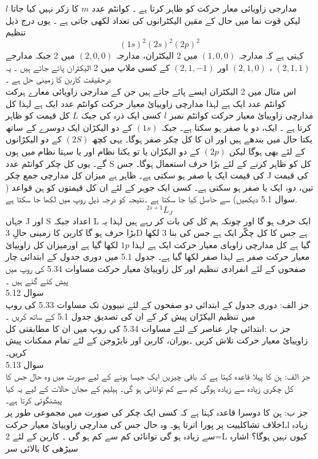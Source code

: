     \(l\)
      مدارجی زاویائی معار حرکت کو ظاہر کرتا ہے ۔ کوانٹم عدد
   \(m\) 
      کا زکر نہیں کیا جاتا لیکن قوت نما میں حال کے مقین الیکٹرانوں کی تعداد لکھی جاتی ہے ۔ یوں درج ذیل تنظیم 
\[(1s)^{2}(2s)^{2}(2p)^{2} \]
کہتی ہے کہ مدارجہ
\((1,0,0)\)
 میں 2 الیکٹران، 
مدارجہ
\(( 2,0,0)\) 
میں 2 جبکہ مدارجے
\(( 2,1,1)\)
، 
\((2,1,0)\) 
اور
 \((2,1,-1)\) 
کے کسی ملاپ میں 2 الیکٹران پائے جاتے ہیں ۔ یہ درحقیقت کاربن کا زمینی حل ہے ۔ \\
اس مثال میں 2 الیکٹران ایسے پائے جاتے ہیں جن کے مدارجی زاویائی معارے ہرکت کوانٹم  عدد ایک ہے لہذا مدارچی زاوییائ معیار حرکت کوانٹم عدد ایک ہے لہذا کل مدارچی زاوییائ معیار حرکت کوانٹم نمبر 
\(l\)
کسی ایک ذرہ کی جبک
\(L\)
کل قیمت کو ظاہر کرتا ہے ۔ ایک، دو یا صفر ہو  سکتا ہے۔ جبکہ
 \((1s)\) 
کے دو الیکڑان ایک دوسرے کے ساتھ یکتا حال میں بندھے ہیں اور ان کا کل چکر صفر ہوگا۔ یہی کچھ
\(( 2S)\)
 کے دو الیکڑانوں کے لئے بھی ہوگا لیکن
 \((2p)\)
 کے دو الیکڑان یا تو یکتا نظام اور یا سہتا نظام میں ہوں گے۔ یوں کل چکر کوانٹم عدد S کل کو ظاہر کرنے کے لئے بڑا حرف استعمال ہوگا۔ جس کی قیمت ایک یا صفر ہو سکتی ہے۔ ظاہر ہے میزان کل مدارچی جمع چکر J کی قیمت تین، دو، ایک یا صفر ہو سکتی ہے۔ کسی ایک جوہر کے لئے ان کل قیمتوں کو ہن قواعد ( سوال 5.1 دیکھیں)  سے حاصل کیا جا سکتا ہے ۔نتیجہ کو درجہ ذیل روپ میں لکھا جا سکتا ہے. 
 \[^{2s+1}L_{J}\]
  جہاں J اور S اعداد جبکہ L ایک حرف ہو گا اور چونکہ ہم کل کی بات کر رہے ہیں لہذا یہ بڑا حرف ہو گا کاربن کا زمینی حالِ 3D ہے جس کا کل چکّر ایک ہے جس کی بنا 3 لکھا گیا ہے کل مدارچی زاویای معیار حرکت ایک ہے لہذا
  \(1p\) 
  لکھا گیا ہے اورمیزان  کل زاوییائ معیار حرکت صفر ہے لہذا صفر لکھا گیا ہے۔ جدول  5.1 میں دوری جدول کے ابتدائی چار صفحوں کے لئے انفرادی  تنظیم اور کل زاوییائ معیار حرکت مساوات 5.34 کی روپ میں پیش کئے گئے ہیں ۔ \\
  سوال 5.12 \\
  جز الف: دوری جدول کے ابتدائی  دو صفحوں  کے لئے نییوون تک مساوات 5.33 کی روپ میں تنظیم الیکڑان پیش کر کے ان کی تصدیق جدول 5.1 کے ساتھ کریں ۔ \\
  جز ب :ابتدائی  چار عناصر  کے لئے مساوات  5.34 کی روپ میں ان کا مطابقتی کل زاوییائ معیار حرکت تلاش کریں ۔بوران، کاربن اور نایڑوجن کے لئے تمام ممکنات پیش کریں۔\\
   سوال 5.13\\ 
   جز الف: ہن کا پہلا قاعدہ کہتا ہے کہ باقی چیزیں ایک جیسا ہونے کے لیے صورت میں وہ حال جس کا کل چکری زیادہ سے زیادہ ہوگی کم سے کم توانائی ہو گی۔ ہیلیم کے ھجان حالات کے لیے یہ کیا پیشنگوئی کرتا ہے۔\\
    جز ب: ہن کا دوسرا قاعدہ کہتا ہے کہ کسی ایک چکر کی صورت میں مجموعی طور پر خلاف تشاکلییت پر پورا اترتا ہو۔ وہ حال جس کی مدارچی زاوییائ معیار حرکتLl زیادہ سے زیادہ ہو گی توانائی کم سے کم ہو گی ۔ کاربن کے لئے 2=L کیوں نہیں ہوگا؟ اشارہ سیڑھی کا بالائی سر

